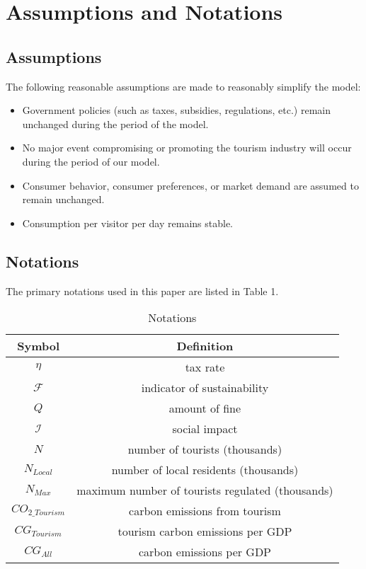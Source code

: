 \section{Assumptions and Notations}

\subsection{Assumptions}

The following reasonable assumptions are made to reasonably simplify the model:

\begin{itemize}
  \item Government policies (such as taxes, subsidies, regulations, etc.) remain unchanged during the period of the model.
  \item No major event compromising or promoting the tourism industry will occur during the period of our model.
  \item Consumer behavior, consumer preferences, or market demand are assumed to remain unchanged.
  \item Consumption per visitor per day remains stable.
\end{itemize}


\subsection{Notations}

The primary notations used in this paper are listed in Table 1.

\begin{table}[!htbp]
  \begin{center}
  \caption{Notations}
  \begin{tabular}{cc}
    \toprule
    \multicolumn{1}{m{3cm}}{\centering Symbol}
    &\multicolumn{1}{m{12cm}}{\centering Definition}\\
    \midrule
    $\eta$         &   tax rate\\
    $\mathcal{F}$         &   indicator of sustainability\\
    $Q$    &   amount of fine\\
    $\mathcal{I}$   &   social impact\\
    $N$    &   number of tourists (thousands)\\
    $N_{Local}$    &   number of local residents (thousands)\\
    $N_{Max}$    &   maximum number of tourists regulated (thousands)\\
    $CO_{2\_Tourism}$    &   carbon emissions from tourism\\
    $CG_{Tourism}$    &   tourism carbon emissions per GDP\\
    $CG_{All}$    &   carbon emissions per GDP\\
    \bottomrule
  \end{tabular}
  \end{center}
\end{table}